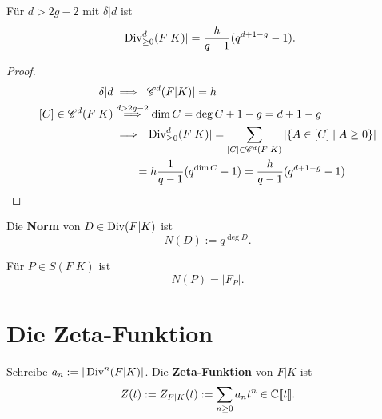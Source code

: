\begin{satz}
    Für $d > 2g - 2$ mit $\delta|d$ ist
    $$ |\operatorname{Div}^d_{\geq 0}(F|K)| = \frac{h}{q-1}(q^{d+1-g}-1).$$
\end{satz}
\begin{proof}
    \begin{align*}
        \delta|d & \implies |\mathscr{C}^d(F|K)| = h\\
        [C] \in \mathscr{C}^d(F|K) & \stackrel{d > 2g - 2}{\implies} \dim C = \deg C + 1 -g = d + 1 -g\\
        & \implies |\operatorname{Div}^d_{\geq 0}(F|K)| = \sum_{[C]\in \mathscr{C}^d(F|K)} |\{A \in [C] \mid A \geq 0\}|\\
        & \qquad = h \frac{1}{q-1}(q^{\dim C} -1) = \frac{h}{q-1}(q^{d +1 -g}-1)
    \end{align*}
\end{proof}

\begin{definition}
    Die \textbf{Norm} von $D \in \operatorname{Div}(F|K)$ ist
    $$ N(D) := q^{\deg D}. $$
\end{definition}

\begin{beispiel}
    Für $P \in S(F|K)$ ist
    $$ N(P) = |F_P|.$$
\end{beispiel}

\section{Die Zeta-Funktion}
\begin{definition}
    Schreibe $a_n := |\operatorname{Div}^n(F|K)|$. Die \textbf{Zeta-Funktion} von $F|K$ ist
    $$ Z(t):=Z_{F|K}(t):= \sum_{n \geq 0} a_n t^n \in \mathbb{C}\llbracket t\rrbracket.$$
\end{definition}


